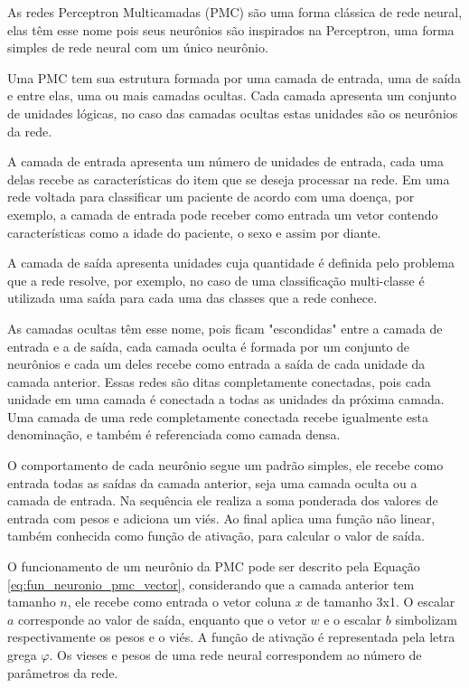 As redes Perceptron Multicamadas (PMC) são uma forma clássica de rede neural, elas têm esse nome pois seus neurônios são inspirados na Perceptron\cite{rosenblatt:58}, uma forma simples de rede neural com um único neurônio.

Uma PMC tem sua estrutura formada por uma camada de entrada, uma de saída e entre elas, uma ou mais camadas ocultas. Cada camada apresenta um conjunto de unidades lógicas, no caso das camadas ocultas estas unidades são os neurônios da rede.

A camada de entrada apresenta um número de unidades de entrada, cada uma delas recebe as características do item que se deseja processar na rede. Em uma rede voltada para classificar um paciente de acordo com uma doença, por exemplo, a camada de entrada pode receber como entrada um vetor contendo características como a idade do paciente, o sexo e assim por diante.

A camada de saída apresenta unidades cuja quantidade é definida pelo problema que a rede resolve, por exemplo, no caso de uma classificação multi-classe é utilizada uma saída para cada uma das classes que a rede conhece.

As camadas ocultas têm esse nome, pois ficam "escondidas" entre a camada de entrada e a de saída, cada camada oculta é formada por um conjunto de neurônios e cada um deles recebe como entrada a saída de cada unidade da camada anterior. Essas redes são ditas completamente conectadas, pois cada unidade em uma camada é conectada a todas as unidades da próxima camada. Uma camada de uma rede completamente conectada recebe igualmente esta denominação, e também é referenciada como camada densa.

O comportamento de cada neurônio segue um padrão simples, ele recebe como entrada todas as saídas da camada anterior, seja uma camada oculta ou a camada de entrada. Na sequência ele realiza a soma ponderada dos valores de entrada com pesos e adiciona um viés. Ao final aplica uma função não linear, também conhecida como função de ativação, para calcular o valor de saída. 

O funcionamento de um neurônio da PMC pode ser descrito pela Equação \ref{eq:fun_neuronio_pmc_vector}, considerando que a camada anterior tem tamanho $n$, ele recebe como entrada o vetor coluna $x$ de tamanho 3x1. O escalar $a$ corresponde ao valor de saída, enquanto que o vetor $w$ e o escalar $b$ simbolizam respectivamente os pesos e o viés. A função de ativação é representada pela letra grega $\varphi$. Os vieses e pesos de uma rede neural correspondem ao número de parâmetros da rede.

